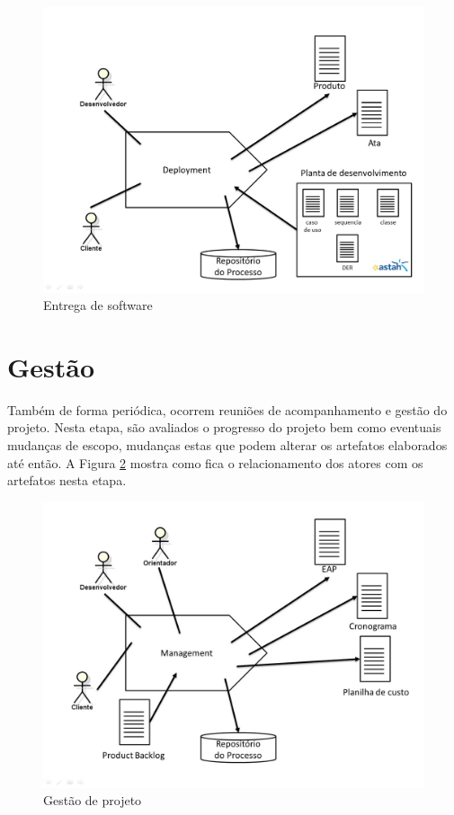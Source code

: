 \begin{figure}[H]
\caption{\label{entrega} Entrega de software}
\includegraphics[scale=0.33]{img/entrega-software.jpg}
\end{figure}

\section{Gestão}
Também de forma periódica, ocorrem reuniões de acompanhamento e gestão do projeto. Nesta etapa, são avaliados o progresso do projeto bem como eventuais mudanças de escopo, mudanças estas que podem alterar os artefatos elaborados até então. A Figura \ref{gestao} mostra como fica o relacionamento dos atores com os artefatos nesta etapa.

\begin{figure}[H]
\caption{\label{gestao} Gestão de projeto}
\includegraphics[scale=0.33]{img/gestao.jpg}
\end{figure}

